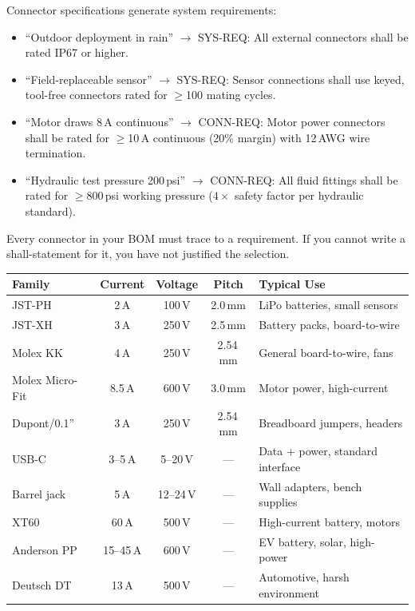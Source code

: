 \documentclass[11pt,letterpaper,twoside,openany]{book}
\begin{document}
\begin{keyconceptbox}
Connector specifications generate system requirements:
\begin{itemize}[nosep,leftmargin=1.5em]
\item ``Outdoor deployment in rain'' $\to$ SYS-REQ: All external connectors shall be rated IP67 or higher.
\item ``Field-replaceable sensor'' $\to$ SYS-REQ: Sensor connections shall use keyed, tool-free connectors rated for $\geq$100 mating cycles.
\item ``Motor draws 8\,A continuous'' $\to$ CONN-REQ: Motor power connectors shall be rated for $\geq$10\,A continuous (20\% margin) with 12\,AWG wire termination.
\item ``Hydraulic test pressure 200\,psi'' $\to$ CONN-REQ: All fluid fittings shall be rated for $\geq$800\,psi working pressure ($4\times$ safety factor per hydraulic standard).
\end{itemize}
Every connector in your BOM must trace to a requirement. If you cannot write a shall-statement for it, you have not justified the selection.
\end{keyconceptbox}

\begin{quickrefbox}
\begin{table}[H]\centering\small
\begin{tabularx}{\textwidth}{l c c c X}
\toprule
\textbf{Family} & \textbf{Current} & \textbf{Voltage} & \textbf{Pitch} & \textbf{Typical Use} \\
\midrule
JST-PH & 2\,A & 100\,V & 2.0\,mm & LiPo batteries, small sensors \\
JST-XH & 3\,A & 250\,V & 2.5\,mm & Battery packs, board-to-wire \\
Molex KK & 4\,A & 250\,V & 2.54\,mm & General board-to-wire, fans \\
Molex Micro-Fit & 8.5\,A & 600\,V & 3.0\,mm & Motor power, high-current \\
Dupont/0.1'' & 3\,A & 250\,V & 2.54\,mm & Breadboard jumpers, headers \\
USB-C & 3--5\,A & 5--20\,V & --- & Data + power, standard interface \\
Barrel jack & 5\,A & 12--24\,V & --- & Wall adapters, bench supplies \\
XT60 & 60\,A & 500\,V & --- & High-current battery, motors \\
Anderson PP & 15--45\,A & 600\,V & --- & EV battery, solar, high-power \\
Deutsch DT & 13\,A & 500\,V & --- & Automotive, harsh environment \\
\bottomrule
\end{tabularx}
\end{table}
\end{quickrefbox}
\end{document}
